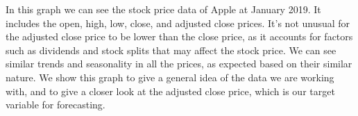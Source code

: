 \documentclass[12pt]{article}
\theoremstyle{definition}
\begin{document}
\begin{minipage}{0.5\textwidth} %
\end{minipage}%
\hfill %
\begin{minipage}{0.45\textwidth} %
  In this graph we can see the stock price data of Apple at January 2019. It includes the open, high, low, close, and adjusted close prices. 
  It's not unusual for the adjusted close price to be lower than the close price, as it accounts for factors such as dividends and stock splits that may affect the stock price. 
  We can see similar trends and seasonality in all the prices, as expected based on their similar nature. 
  We show this graph to give a general idea of the data we are working with, and to give a closer look at the adjusted close price, which is our target variable for forecasting.
\end{minipage}
\end{document}
